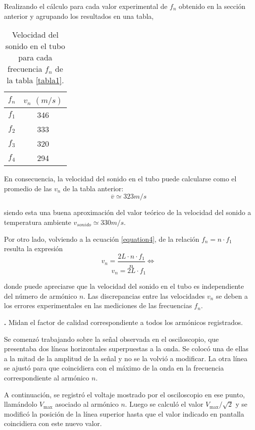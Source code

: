 \documentclass[12pt, a4paper]{article}
\newcounter{step}
\newcommand{\step}[1]
{
  \par\vspace{2ex}
  \stepcounter{step}
  \noindent\textbf{\arabic{step}.} #1\par\vspace{1ex}
}
\begin{document}
Realizando el cálculo para cada valor experimental de $f_{n}$ obtenido en la sección anterior y agrupando los resultados en una tabla,

\begin{table}[H]
    \centering
    \begin{tabular}{|c|c|}
    \hline
    \multirow{1}{2.1cm}{\centering $f_n$} 
        & $v_{n}$ $(m/s)$ \\
    \hline
    $f_1$  & 346 \\ \hline
    $f_2$  & 333 \\ \hline
    $f_3$  & 320 \\ \hline
    $f_4$  & 294  \\ \hline
    \end{tabular}
    \caption{Velocidad del sonido en el tubo para cada frecuencia $f_{n}$ de la tabla \ref{tabla1}.}
    \label{tabla2}
\end{table}

En consecuencia, la velocidad del sonido en el tubo puede calcularse como el promedio de las $v_{n}$ de la tabla anterior:
$$\overline{v} \simeq 323 m/s$$

siendo esta una buena aproximación del valor teórico de la velocidad del sonido a temperatura ambiente $v_{sonido}\simeq 330 m/s$.

Por otro lado, volviendo a la ecuación \ref{equation4}, de la relación $f_{n}=n\cdot f_{1}$ resulta la expresión
$$ v_{n} = \frac{2L \cdot n \cdot f_{1}}{n} \Longleftrightarrow $$
$$ v_{n} = 2L \cdot f_{1} $$

donde puede apreciarse que la velocidad del sonido en el tubo es independiente del número de armónico $n$. Las discrepancias entre las velocidades $v_{n}$ se deben a los errores experimentales en las mediciones de las frecuencias $f_{n}$.


\step{Midan el factor de calidad correspondiente a todos los armónicos registrados.}

Se comenzó trabajando sobre la señal observada en el osciloscopio, que presentaba dos líneas horizontales superpuestas a la onda. Se colocó una de ellas a la mitad de la amplitud de la señal y no se la  volvió a modificar. La otra línea se ajustó para que coincidiera con el máximo de la onda en la frecuencia correspondiente al armónico $n$.

A continuación, se registró el voltaje mostrado por el osciloscopio en ese punto, llamándolo $V_\mathrm{max}$ asociado al armónico $n$. Luego se calculó el valor $V_\mathrm{max}/\sqrt{2}$ y se modificó la posición de la línea superior hasta que el valor indicado en pantalla coincidiera con este nuevo valor.
\end{document}
